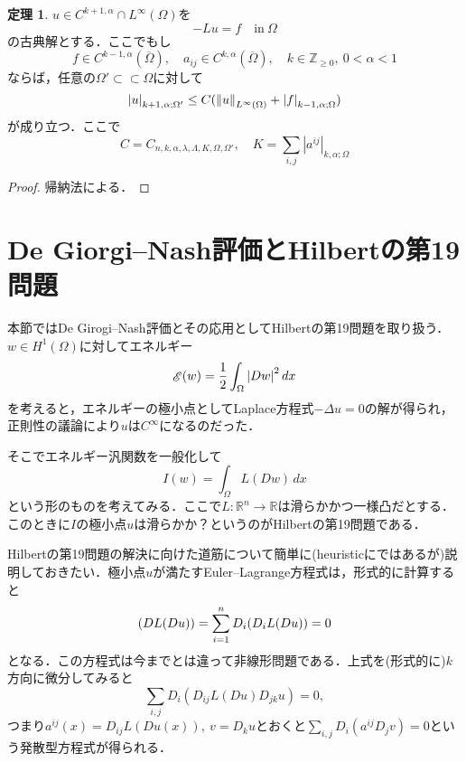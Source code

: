 \documentclass[a4paper]{ltjsarticle}
\newcommand{\Rset}{\mathbb{R}}
\newcommand{\Zset}{\mathbb{Z}}
\newcommand{\Om}{\Omega}
\newcommand{\Ombar}{\overline{\Omega}}
\newcommand{\ssubset}{\subset\subset}
\newcommand{\inn}{\quad\text{in}\ }
\newcommand{\1}{\mathbbm{1}}
\let\div\relax
\DeclareMathOperator{\div}{\mathrm{div}}
\numberwithin{equation}{section}
\theoremstyle{definition}
\newtheorem{thm}{定理}[section]
\begin{document}
\begin{thm}
    $u\in C^{k+1,\alpha}\cap L^\infty(\Om)$を 
    \begin{equation}
        -Lu=f\inn \Om 
    \end{equation}
    の古典解とする．ここでもし
    \begin{equation}
        f\in C^{k-1,\alpha}(\Ombar),\quad a_{ij}\in C^{k,\alpha}(\Ombar),\quad k\in\Zset_{\geq0},\ 0<\alpha<1 
    \end{equation}
    ならば，任意の$\Om'\ssubset \Om$に対して
    \begin{equation}
        \abs{u}_{k+1,\alpha;\Om'}\leq C(\norm{u}_{L^\infty(\Om)}+\abs{f}_{k-1,\alpha;\Om})
    \end{equation}
    が成り立つ．ここで
    \begin{equation}
        C=C_{n,k,\alpha,\lambda,\Lambda,K,\Om,\Om'},\quad K=\sum_{i,j}|a^{ij}|_{k,\alpha;\Om}
    \end{equation}
\end{thm}
\begin{proof}
    帰納法による．
\end{proof}
\section{De Giorgi--Nash評価とHilbertの第19問題}
本節ではDe Girogi--Nash評価とその応用としてHilbertの第19問題を取り扱う．$w\in H^1(\Om)$に対してエネルギー
\begin{equation}
\mathop{\mathscr{E}}(w)=\frac{1}{2}\int_{\Om}\abs{Dw}^2\,dx 
\end{equation}
を考えると，エネルギーの極小点としてLaplace方程式$-\Delta u=0$の解が得られ，正則性の議論により$u$は$C^\infty$になるのだった．

そこでエネルギー汎関数を一般化して
\begin{equation}
    I(w)=\int_{\Om} L(Dw)\,dx 
\end{equation}
という形のものを考えてみる．ここで$L\colon \Rset^n\to\Rset$は滑らかかつ一様凸だとする．このときに$I$の極小点$u$は滑らかか？というのがHilbertの第19問題である．

Hilbertの第19問題の解決に向けた道筋について簡単に(heuristicにではあるが)説明しておきたい．極小点$u$が満たすEuler--Lagrange方程式は，形式的に計算すると
\begin{equation}
    \div(DL(Du))=\sum_{i=1}^{n}D_i(D_iL(Du))=0
\end{equation}
となる．この方程式は今までとは違って非線形問題である．上式を(形式的に)$k$方向に微分してみると
\begin{equation}
    \sum_{i,j}D_i(D_{ij}L(Du)D_{jk}u)=0,
\end{equation}
つまり$a^{ij}(x)=D_{ij}L(Du(x)),\ v=D_ku$とおくと$\sum_{i,j}D_{i}(a^{ij}D_jv)=0$という発散型方程式が得られる．
\end{document}

